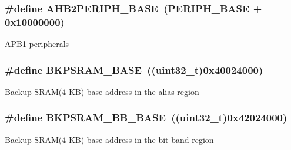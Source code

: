 \subsubsection[{\texorpdfstring{A\+H\+B2\+P\+E\+R\+I\+P\+H\+\_\+\+B\+A\+SE}{AHB2PERIPH_BASE}}]{\setlength{\rightskip}{0pt plus 5cm}\#define A\+H\+B2\+P\+E\+R\+I\+P\+H\+\_\+\+B\+A\+SE~({\bf P\+E\+R\+I\+P\+H\+\_\+\+B\+A\+SE} + 0x10000000)}\hypertarget{group___peripheral__memory__map_gaeedaa71d22a1948492365e2cd26cfd46}{}\label{group___peripheral__memory__map_gaeedaa71d22a1948492365e2cd26cfd46}
A\+P\+B1 peripherals 
\subsubsection[{\texorpdfstring{B\+K\+P\+S\+R\+A\+M\+\_\+\+B\+A\+SE}{BKPSRAM_BASE}}]{\setlength{\rightskip}{0pt plus 5cm}\#define B\+K\+P\+S\+R\+A\+M\+\_\+\+B\+A\+SE~((uint32\+\_\+t)0x40024000)}\hypertarget{group___peripheral__memory__map_ga52e57051bdf8909222b36e5408a48f32}{}\label{group___peripheral__memory__map_ga52e57051bdf8909222b36e5408a48f32}
Backup S\+R\+A\+M(4 K\+B) base address in the alias region 
\subsubsection[{\texorpdfstring{B\+K\+P\+S\+R\+A\+M\+\_\+\+B\+B\+\_\+\+B\+A\+SE}{BKPSRAM_BB_BASE}}]{\setlength{\rightskip}{0pt plus 5cm}\#define B\+K\+P\+S\+R\+A\+M\+\_\+\+B\+B\+\_\+\+B\+A\+SE~((uint32\+\_\+t)0x42024000)}\hypertarget{group___peripheral__memory__map_gaee19a30c9fa326bb10b547e4eaf4e250}{}\label{group___peripheral__memory__map_gaee19a30c9fa326bb10b547e4eaf4e250}
Backup S\+R\+A\+M(4 K\+B) base address in the bit-\/band region 
